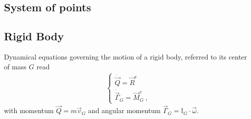 \documentclass[letterpaper,10pt,english]{jupyterBook}
\begin{document}
\subsection{System of points}
\label{\detokenize{ch/lagrange-points:system-of-points}}\label{\detokenize{ch/lagrange-points:classical-mechanics-lagrange-points}}\label{\detokenize{ch/lagrange-points::doc}}
\sphinxAtStartPar
{}

\sphinxAtStartPar
{}

\sphinxAtStartPar
{}

\sphinxstepscope


\subsection{Rigid Body}
\label{\detokenize{ch/lagrange-rigid-body:rigid-body}}\label{\detokenize{ch/lagrange-rigid-body:classical-mechanics-lagrange-rigid}}\label{\detokenize{ch/lagrange-rigid-body::doc}}
\sphinxAtStartPar
{} Dynamical equations governing the motion of a rigid body, referred to its center of mass \(G\) read
\begin{equation*}
\begin{split}\begin{cases}
  \dot{\vec{Q}} = \vec{R}^{e} \\
  \dot{\vec{\Gamma}}_G = \vec{M}^e_G \ ,
\end{cases}\end{split}
\end{equation*}
\sphinxAtStartPar
with momentum \(\vec{Q} = m \vec{v}_G\) and angular momentum \(\vec{\Gamma}_G = \mathbb{I}_G \cdot \vec{\omega}\).
\end{document}
